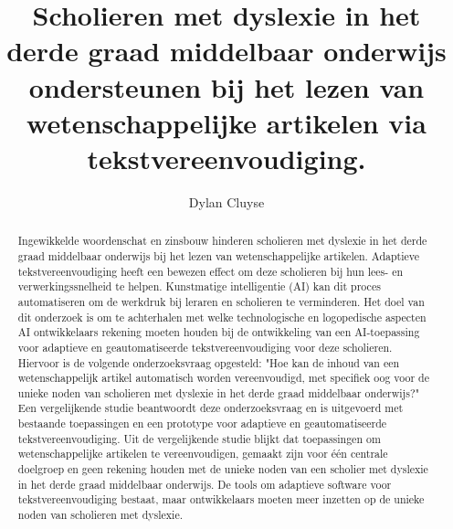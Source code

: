 \documentclass{hogent-article}
\title{Scholieren met dyslexie in het derde graad middelbaar onderwijs ondersteunen bij het lezen van wetenschappelijke artikelen via tekstvereenvoudiging.}
\author{Dylan Cluyse}
\begin{document}
	
\begin{abstract}
Ingewikkelde woordenschat en zinsbouw hinderen scholieren met dyslexie in het derde graad middelbaar onderwijs bij het lezen van wetenschappelijke artikelen. Adaptieve tekstvereenvoudiging heeft een bewezen effect om deze scholieren bij hun lees- en verwerkingssnelheid te helpen. Kunstmatige intelligentie (AI) kan dit proces automatiseren om de werkdruk bij leraren en scholieren te verminderen. Het doel van dit onderzoek is om te achterhalen met welke technologische en logopedische aspecten AI ontwikkelaars rekening moeten houden bij de ontwikkeling van een AI-toepassing voor adaptieve en geautomatiseerde tekstvereenvoudiging voor deze scholieren. Hiervoor is de volgende onderzoeksvraag opgesteld: "Hoe kan de inhoud van een wetenschappelijk artikel automatisch worden vereenvoudigd, met specifiek oog voor de unieke noden van scholieren met dyslexie in het derde graad middelbaar onderwijs?" Een vergelijkende studie beantwoordt deze onderzoeksvraag en is uitgevoerd met bestaande toepassingen en een prototype voor adaptieve en geautomatiseerde tekstvereenvoudiging. Uit de vergelijkende studie blijkt dat toepassingen om wetenschappelijke artikelen te vereenvoudigen, gemaakt zijn voor één centrale doelgroep en geen rekening houden met de unieke noden van een scholier met dyslexie in het derde graad middelbaar onderwijs. De tools om adaptieve software voor tekstvereenvoudiging bestaat, maar ontwikkelaars moeten meer inzetten op de unieke noden van scholieren met dyslexie.
\end{abstract}


\tableofcontents



\printbibliography[heading=bibintoc]
\end{document}
